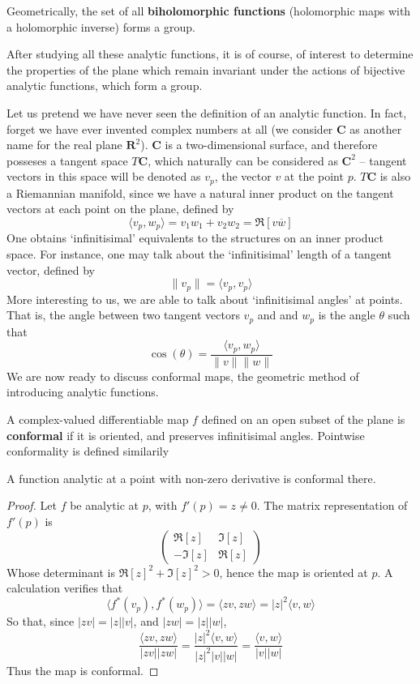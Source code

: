 Geometrically, the set of all {\bf biholomorphic functions} (holomorphic maps with a holomorphic inverse) forms a group.

After studying all these analytic functions, it is of course, of interest to determine the properties of the plane which remain invariant under the actions of bijective analytic functions, which form a group.

Let us pretend we have never seen the definition of an analytic function. In fact, forget we have ever invented complex numbers at all (we consider $\mathbf{C}$ as another name for the real plane $\mathbf{R}^2$). $\mathbf{C}$ is a two-dimensional surface, and therefore posseses a tangent space $T\mathbf{C}$, which naturally can be considered as $\mathbf{C}^2$ -- tangent vectors in this space will be denoted as $v_p$, the vector $v$ at the point $p$. $T\mathbf{C}$ is also a Riemannian manifold, since we have a natural inner product on the tangent vectors at each point on the plane, defined by
%
\[ \langle v_p, w_p \rangle = v_1 w_1 + v_2 w_2 = \Re[v\overline{w}] \]
%
One obtains `infinitisimal' equivalents to the structures on an inner product space. For instance, one may talk about the `infinitisimal' length of a tangent vector, defined by
%
\[ \| v_p \| = \langle v_p, v_p \rangle \]
%
More interesting to us, we are able to talk about `infinitisimal angles' at points. That is, the angle between two tangent vectors $v_p$ and and $w_p$ is the angle $\theta$ such that
%
\[ \cos(\theta) = \frac{\langle v_p, w_p \rangle}{\|v\| \|w\|} \]
%
We are now ready to discuss conformal maps, the geometric method of introducing analytic functions.

A complex-valued differentiable map $f$ defined on an open subset of the plane is {\bf conformal} if it is oriented, and preserves infinitisimal angles. Pointwise conformality is defined similarily

\begin{lemma}
    A function analytic at a point with non-zero derivative is conformal there.
\end{lemma}
\begin{proof}
    Let $f$ be analytic at $p$, with $f'(p) = z \neq 0$. The matrix representation of $f'(p)$ is
    \[ \begin{pmatrix} \Re[z] & \Im[z] \\ -\Im[z] & \Re[z] \end{pmatrix} \]
    Whose determinant is $\Re[z]^2 + \Im[z]^2 > 0$, hence the map is oriented at $p$. A calculation verifies that
    \[ \langle f^*(v_p), f^*(w_p) \rangle = \langle zv, zw \rangle = |z|^2 \langle v, w \rangle  \]
    So that, since $|zv| = |z||v|$, and $|zw| = |z||w|$,
    \[ \frac{\langle zv, zw \rangle}{|zv||zw|} = \frac{|z|^2 \langle v, w \rangle }{|z|^2|v||w|} = \frac{\langle v, w \rangle}{|v||w|} \]
    Thus the map is conformal.
\end{proof}

